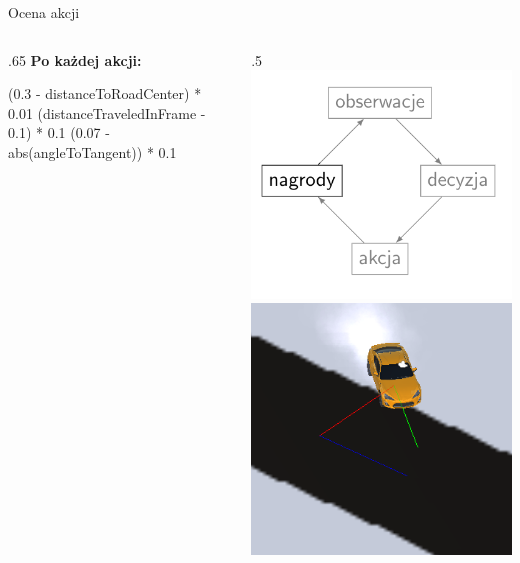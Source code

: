 \begin{frame}{Ocena akcji}

	\begin{columns}
		\begin{column}{.65\hsize}
			\textbf{Po każdej akcji:}
			\begin{itemize}
				\myitem (0.3 - distanceToRoadCenter) * 0.01
				\myitem (distanceTraveledInFrame - 0.1) * 0.1
				\myitem (0.07 - abs(angleToTangent)) * 0.1
			\end{itemize}
			\vspace{5cm}
		\end{column}
		
		\begin{column}{.5\hsize}
			{\hspace*{.6\linewidth}\includegraphics[width=.4\linewidth]{figures/learning_loop_4.png}}
			\vspace{7cm}
			\includegraphics[width=\linewidth]{figures/rewards.png}
		\end{column}
	\end{columns}
	
\end{frame}
